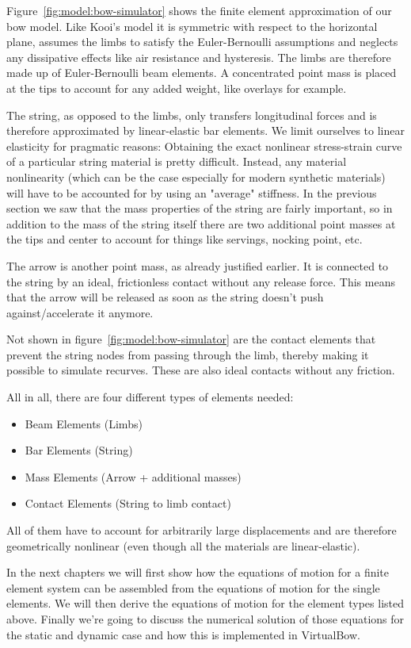 Figure~\ref{fig:model:bow-simulator} shows the finite element approximation of our bow model. Like Kooi's model it is symmetric with respect to the horizontal plane, assumes the limbs to satisfy the Euler-Bernoulli assumptions and neglects any dissipative effects like air resistance and hysteresis. The limbs are therefore made up of Euler-Bernoulli beam elements. A concentrated point mass is placed at the tips to account for any added weight, like overlays for example.

The string, as opposed to the limbs, only transfers longitudinal forces and is therefore approximated by linear-elastic bar elements. We limit ourselves to linear elasticity for pragmatic reasons: Obtaining the exact nonlinear stress-strain curve of a particular string material is pretty difficult. Instead, any material nonlinearity (which can be the case especially for modern synthetic materials) will have to be accounted for by using an "average" stiffness. In the previous section we saw that the mass properties of the string are fairly important, so in addition to the mass of the string itself there are two additional point masses at the tips and center to account for things like servings, nocking point, etc.

The arrow is another point mass, as already justified earlier. It is connected to the string by an ideal, frictionless contact without any release force. This means that the arrow will be released as soon as the string doesn't push against/accelerate it anymore.

Not shown in figure~\ref{fig:model:bow-simulator} are the contact elements that prevent the string nodes from passing through the limb, thereby making it possible to simulate recurves. These are also ideal contacts without any friction.

All in all, there are four different types of elements needed:

\begin{itemize}
\item Beam Elements (Limbs)
\item Bar Elements (String)
\item Mass Elements (Arrow + additional masses)
\item Contact Elements (String to limb contact)
\end{itemize}

All of them have to account for arbitrarily large displacements and are therefore geometrically nonlinear (even though all the materials are linear-elastic).

In the next chapters we will first show how the equations of motion for a finite element system can be assembled from the equations of motion for the single elements. We will then derive the equations of motion for the element types listed above. Finally we're going to discuss the numerical solution of those equations for the static and dynamic case and how this is implemented in VirtualBow.